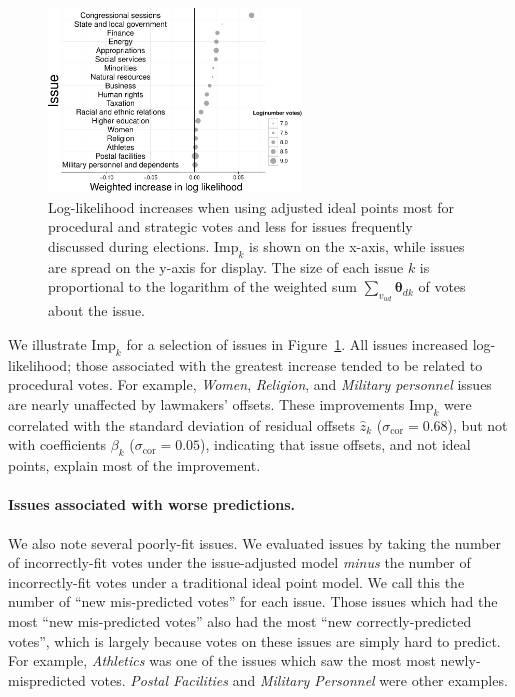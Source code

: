 \begin{figure}
  \center
  \includegraphics[width=0.6\textwidth]{chapter_spatial_voting_with_text/figures/3393_interesting_offsets.pdf}
  \caption{Log-likelihood increases when using adjusted ideal points
  most for procedural and strategic votes and less for issues
  frequently discussed during elections.  $\mbox{Imp}_k$ is shown on
  the x-axis, while issues are spread on the y-axis for display.
  The size of each issue $k$ is proportional to the logarithm of the
  weighted sum $\sum_{v_{ud}} \bm \theta_{dk}$ of votes about the
  issue.}
  \label{figure:issue_improvements}
\end{figure}
We illustrate $\mbox{Imp}_k$ for a selection of issues in
Figure~\ref{figure:issue_improvements}.  All issues increased
log-likelihood; those associated with the greatest increase tended to
be related to procedural votes.  For example, \emph{Women},
\emph{Religion}, and \emph{Military personnel} issues are nearly
unaffected by lawmakers' offsets.  These improvements $\mbox{Imp}_k$
were correlated with the standard deviation of residual offsets $\hat
z_k$ ($\sigma_{\mbox{cor}}=0.68$), but not with coefficients $\beta_k$
($\sigma_{\mbox{cor}}=0.05$), indicating that issue offsets, and not
ideal points, explain most of the improvement.

\paragraph{Issues associated with worse predictions.}
We also note several poorly-fit issues.  We evaluated issues by taking
the number of incorrectly-fit votes under the issue-adjusted model
\emph{minus} the number of incorrectly-fit votes under a traditional ideal
point model.  We call this the number of ``new mis-predicted votes''
for each issue.  Those issues which had the most ``new mis-predicted
votes'' also had the most ``new correctly-predicted votes'', which is
largely because votes on these issues are simply hard to predict.  For
example, \emph{Athletics} was one of the issues which saw the most
most newly-mispredicted votes.  \emph{Postal Facilities} and
\emph{Military Personnel} were other examples.

